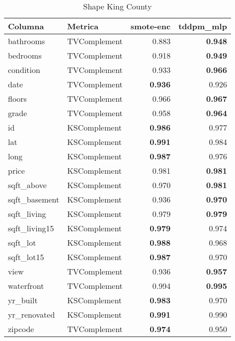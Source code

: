 \begin{table}[H]
\centering
\caption{Shape King County}
\label{table-shape-king county-a-3}
\begin{tabular}{|l|l|r|r|}
\hline
\rowcolor[gray]{0.8}
Columna & Metrica & smote-enc & tddpm\_mlp \\
\hline bathrooms & TVComplement & 0.883 & \bfseries 0.948 \\
\hline bedrooms & TVComplement & 0.918 & \bfseries 0.949 \\
\hline condition & TVComplement & 0.933 & \bfseries 0.966 \\
\hline date & TVComplement & \bfseries 0.936 & 0.926 \\
\hline floors & TVComplement & 0.966 & \bfseries 0.967 \\
\hline grade & TVComplement & 0.958 & \bfseries 0.964 \\
\hline id & KSComplement & \bfseries 0.986 & 0.977 \\
\hline lat & KSComplement & \bfseries 0.991 & 0.984 \\
\hline long & KSComplement & \bfseries 0.987 & 0.976 \\
\hline price & KSComplement & 0.981 & \bfseries 0.981 \\
\hline sqft\_above & KSComplement & 0.970 & \bfseries 0.981 \\
\hline sqft\_basement & KSComplement & 0.936 & \bfseries 0.970 \\
\hline sqft\_living & KSComplement & 0.979 & \bfseries 0.979 \\
\hline sqft\_living15 & KSComplement & \bfseries 0.979 & 0.974 \\
\hline sqft\_lot & KSComplement & \bfseries 0.988 & 0.968 \\
\hline sqft\_lot15 & KSComplement & \bfseries 0.987 & 0.970 \\
\hline view & TVComplement & 0.936 & \bfseries 0.957 \\
\hline waterfront & TVComplement & 0.994 & \bfseries 0.995 \\
\hline yr\_built & KSComplement & \bfseries 0.983 & 0.970 \\
\hline yr\_renovated & KSComplement & \bfseries 0.991 & 0.990 \\
\hline zipcode & TVComplement & \bfseries 0.974 & 0.950 \\
\hline
\end{tabular}
\end{table}
